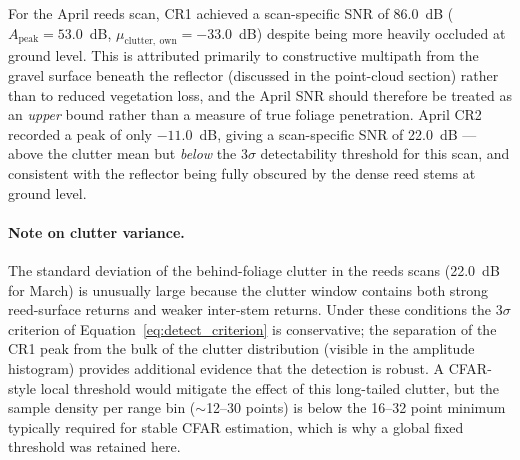 For the April reeds scan, CR1 achieved a scan-specific SNR of 86.0~dB
($A_{\mathrm{peak}} = 53.0$~dB, $\mu_{\mathrm{clutter,\ own}} = -33.0$~dB)
despite being more heavily occluded at ground level.
This is attributed primarily to constructive multipath from the gravel
surface beneath the reflector (discussed in the point-cloud section) rather
than to reduced vegetation loss, and the April SNR should therefore be
treated as an \emph{upper} bound rather than a measure of true foliage
penetration.
April CR2 recorded a peak of only $-11.0$~dB, giving a scan-specific SNR of
22.0~dB --- above the clutter mean but \emph{below} the $3\sigma$
detectability threshold for this scan, and consistent with the reflector
being fully obscured by the dense reed stems at ground level.

\paragraph{Note on clutter variance.}
The standard deviation of the behind-foliage clutter in the reeds scans
(22.0~dB for March) is unusually large because the clutter window contains
both strong reed-surface returns and weaker inter-stem returns.
Under these conditions the $3\sigma$ criterion of
Equation~\ref{eq:detect_criterion} is conservative; the separation of the CR1
peak from the bulk of the clutter distribution (visible in the amplitude
histogram) provides additional evidence that the detection is robust.
A CFAR-style local threshold would mitigate the effect of this long-tailed
clutter, but the sample density per range bin
($\sim$12--30 points)
is below the 16--32 point minimum typically required for stable CFAR
estimation, which is why a global fixed threshold was retained here.



